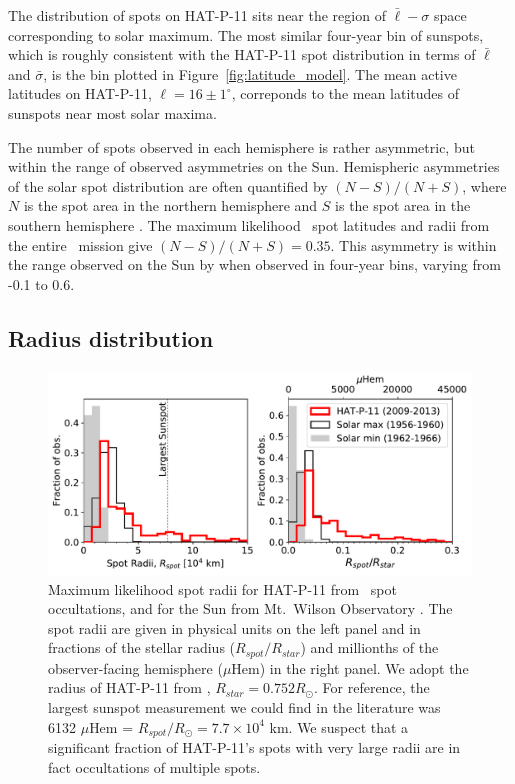 The distribution of spots on HAT-P-11 sits near the region of $\bar{\ell} - \sigma$ space corresponding to solar maximum. The most similar four-year bin of sunspots, which is roughly consistent with the HAT-P-11 spot distribution in terms of $\bar{\ell}$ and $\bar{\sigma}$, is the bin plotted in Figure~\ref{fig:latitude_model}. The mean active latitudes on HAT-P-11, $\ell = 16 \pm 1^\circ$, correponds to the mean latitudes of sunspots near most solar maxima.

The number of spots observed in each hemisphere is rather asymmetric, but within the range of observed asymmetries on the Sun. Hemispheric asymmetries of the solar spot distribution are often quantified by $(N-S)/(N+S)$, where $N$ is the spot area in the northern hemisphere and $S$ is the spot area in the southern hemisphere \citep{Waldmeier1971, Carbonell1993}. The maximum likelihood \stsp\ spot latitudes and radii from the entire \kepler\ mission give $(N-S)/(N+S)=0.35$. This asymmetry is within the range observed on the Sun by \citet{Howard1984} when observed in four-year bins, varying from -0.1 to 0.6.

\subsection{Radius distribution} \label{sec:radii}

\begin{figure}
\centering
\includegraphics[scale=0.75]{stsp_hat_p_11/spot_radii.pdf}
\caption{Maximum likelihood spot radii for HAT-P-11 from \kepler\ spot occultations, and for the Sun from Mt.~Wilson Observatory \citep{Howard1984}. The spot radii are given in physical units on the left panel and in fractions of the stellar radius ($R_{spot}/R_{star}$) and millionths of the observer-facing hemisphere ($\mu$Hem) in the right panel. We adopt the radius of HAT-P-11 from \citet{bakos2010}, $R_{star} = 0.752 R_\odot$. For reference, the largest sunspot measurement we could find in the literature was 6132 $\mu$Hem = $R_{spot} / R_{\odot} = 7.7 \times 10^4$ km. We suspect that a significant fraction of HAT-P-11's spots with very large radii are in fact occultations of multiple spots.}
\label{fig:radii}
\end{figure}

